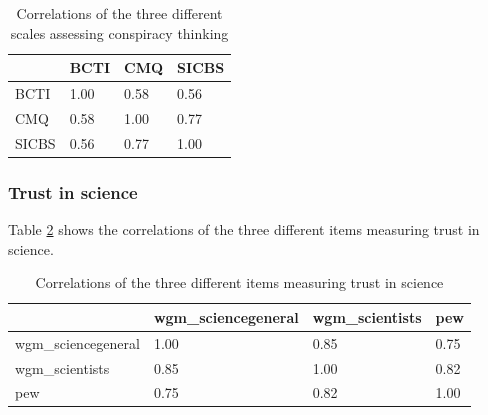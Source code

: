 \documentclass[
  doc,floatsintext]{apa6}
\begin{document}
\begin{table}[h]

\begin{center}
\begin{threeparttable}

\caption{\label{tab:correlation-conspiracy}Correlations of the three different scales assessing conspiracy thinking}

\begin{tabular}{llll}
\toprule
 & \multicolumn{1}{c}{BCTI} & \multicolumn{1}{c}{CMQ} & \multicolumn{1}{c}{SICBS}\\
\midrule
BCTI & 1.00 & 0.58 & 0.56\\
CMQ & 0.58 & 1.00 & 0.77\\
SICBS & 0.56 & 0.77 & 1.00\\
\bottomrule
\end{tabular}

\end{threeparttable}
\end{center}

\end{table}

\subsubsection{Trust in science}\label{trust-in-science-3}

Table \ref{tab:correlation-trust} shows the correlations of the three different items measuring trust in science.

\begin{table}[h]

\begin{center}
\begin{threeparttable}

\caption{\label{tab:correlation-trust}Correlations of the three different items measuring trust in science}

\begin{tabular}{llll}
\toprule
 & \multicolumn{1}{c}{wgm\_sciencegeneral} & \multicolumn{1}{c}{wgm\_scientists} & \multicolumn{1}{c}{pew}\\
\midrule
wgm\_sciencegeneral & 1.00 & 0.85 & 0.75\\
wgm\_scientists & 0.85 & 1.00 & 0.82\\
pew & 0.75 & 0.82 & 1.00\\
\bottomrule
\end{tabular}

\end{threeparttable}
\end{center}

\end{table}
\end{document}
